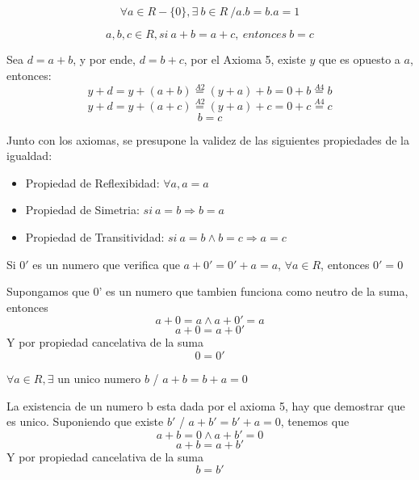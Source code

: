 \documentclass[10pt]{article}
\begin{document}
\begin{axiom}{}
$$\forall a \in R-\{0\}, \exists\ b \in R\ / a.b = b.a = 1$$
\end{axiom}

\begin{theo}{}
$$a,b,c \in R, si\ a+b = a+c,\ entonces\ b=c $$
\begin{prf}{}
Sea $d=a+b$, y por ende, $d=b+c$, por el Axioma 5, existe $y$ que es opuesto  a $a$, entonces:
$$y+d=y+(a+b) \overset{A2}{=} (y+a)+b = 0 + b \overset{A4}{=}b$$
$$y+d=y+(a+c) \overset{A2}{=} (y+a)+c = 0 + c \overset{A4}{=}c$$
$$b=c$$
\end{prf}
\end{theo}

\begin{data}{}
Junto con los axiomas, se presupone la validez de las siguientes propiedades de la igualdad:
\begin{itemize}
\item Propiedad de Reflexibidad: $\forall a, a=a$
\item Propiedad de Simetria: $si\ a=b \Rightarrow b=a$
\item Propiedad de Transitividad: $si\ a=b \land b=c \Rightarrow a=c$
\end{itemize}
\end{data}

\begin{cor}{}
Si $0'$ es un numero que verifica que $a+0' = 0'+a = a$, $\forall a \in R$, entonces $0' = 0$
\begin{prf}{}
Supongamos que 0' es un numero que tambien funciona como neutro de la suma, entonces
$$a+0=a \land a+0'=a$$
$$a+0=a+0'$$
Y por propiedad cancelativa de la suma
$$0=0'$$
\end{prf}
\end{cor}

\begin{cor}{}
$\forall a \in R, \exists$ un unico numero $b$ / $a+b=b+a =0$
\begin{prf}{}
La existencia de un numero b esta dada por el axioma 5, hay que demostrar que es unico. Suponiendo que existe $b'$ / $a+b'=b'+a=0$, tenemos que
$$a+b=0 \land a+b'=0$$
$$a+b = a+b'$$
Y por propiedad cancelativa de la suma
$$b=b'$$
\end{prf}
\end{cor}
\end{document}
